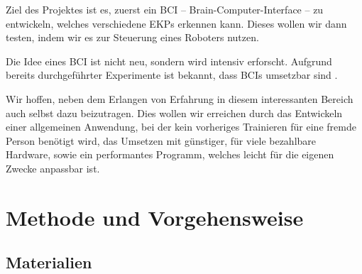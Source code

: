 \documentclass{scrartcl}
\begin{document}
	Ziel des Projektes ist es, zuerst ein BCI -- Brain-Computer-Interface -- zu entwickeln, welches verschiedene EKPs erkennen kann. Dieses wollen wir dann testen, indem wir es zur Steuerung eines Roboters nutzen.

	Die Idee eines BCI ist nicht neu, sondern wird intensiv erforscht. Aufgrund bereits durchgeführter Experimente ist bekannt, dass BCIs umsetzbar sind \cite{BCIChaudhary}.
	
	Wir hoffen, neben dem Erlangen von Erfahrung in diesem interessanten Bereich auch selbst dazu beizutragen. Dies wollen wir erreichen durch das Entwickeln einer allgemeinen Anwendung, bei der kein vorheriges Trainieren für eine fremde Person benötigt wird, das Umsetzen mit günstiger, für viele bezahlbare Hardware, sowie ein performantes Programm, welches leicht für die eigenen Zwecke anpassbar ist.

	\section{Methode und Vorgehensweise}

	\subsection{Materialien} \label{Materialien}
\end{document}
